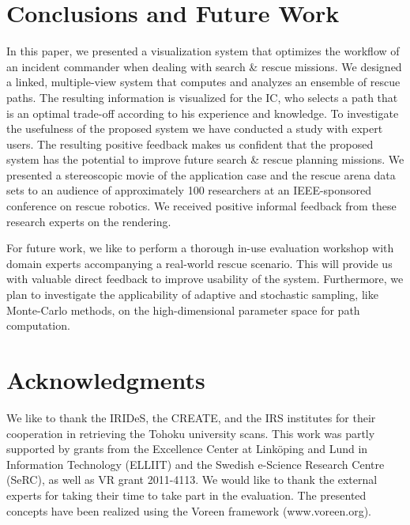 \documentclass{egpubl}
\def\IC{IC}
\begin{document}
\section{Conclusions and Future Work} \label{sec:conclusion}
In this paper, we presented a visualization system that optimizes the workflow of an incident commander when dealing with search \& rescue missions. We designed a linked, multiple-view system that computes and analyzes an ensemble of rescue paths. The resulting information is visualized for the \IC , who selects a path that is an optimal trade-off according to his experience and knowledge. To investigate the usefulness of the proposed system we have conducted a study with expert users. The resulting positive feedback makes us confident that the proposed system has the potential to improve future search \& rescue planning missions. We presented a stereoscopic movie of the application case and the rescue arena data sets to an audience of approximately 100 researchers at an IEEE-sponsored conference on rescue robotics. We received positive informal feedback from these research experts on the rendering.

For future work, we like to perform a thorough in-use evaluation workshop with domain experts accompanying a real-world rescue scenario. This will provide us with valuable direct feedback to improve usability of the system. Furthermore, we plan to investigate the applicability of adaptive and stochastic sampling, like Monte-Carlo methods, on the high-dimensional parameter space for path computation.


\section*{Acknowledgments}
We like to thank the IRIDeS, the CREATE, and the IRS institutes for their cooperation in retrieving the Tohoku university scans.
This work was partly supported by grants from the Excellence Center at Link\"oping and Lund in Information Technology (ELLIIT) and the Swedish e-Science Research Centre (SeRC), as well as VR grant 2011-4113. We would like to thank the external experts for taking their time to take part in the evaluation. The presented concepts have been realized using the Voreen framework (www.voreen.org).



\end{document}
